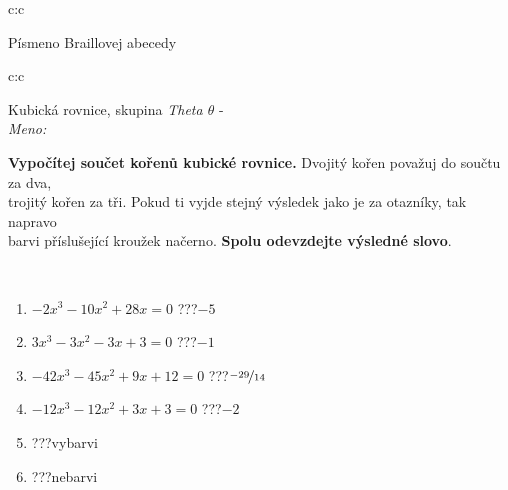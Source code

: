 \documentclass[10pt]{report}
\begin{document}
\begin{tabular}{c:c}
\begin{minipage}[c][104.5mm][t]{0.5\linewidth}
\begin{center}
\begin{minipage}{0.20\linewidth}
\begin{center}
{\small Písmeno Braillovej abecedy}
\end{center}
\end{minipage}
\end{center}
\end{minipage}
%
\end{tabular}
\newpage
\thispagestyle{empty}
\begin{tabular}{c:c}
\begin{minipage}[c][104.5mm][t]{0.5\linewidth}
\begin{center}
\vspace{7mm}
{\huge Kubická rovnice, skupina \textit{Theta $\theta$} -}\\[5mm]
\textit{Meno:}\phantom{xxxxxxxxxxxxxxxxxxxxxxxxxxxxxxxxxxxxxxxxxxxxxxxxxxxxxxxxxxxxxxxxx}\\[5mm]
\begin{minipage}{0.95\linewidth}
\textbf{Vypočítej součet kořenů kubické rovnice.} Dvojitý kořen považuj do součtu za dva,\\trojitý kořen za tři. Pokud ti vyjde stejný výsledek jako je za otazníky, tak napravo\\barvi příslušející kroužek načerno. \textbf{Spolu odevzdejte výsledné slovo}.
\end{minipage}
\\[1mm]
\begin{minipage}{0.79\linewidth}
\begin{center}
\begin{varwidth}{\linewidth}
\begin{enumerate}
\Large
\item $-2x^3-10x^2+28x=0$\quad \dotfill\; ???\;\dotfill \quad $-5$
\item $3x^3-3x^2-3x+3=0$\quad \dotfill\; ???\;\dotfill \quad $-1$
\item $-42x^3-45x^2+9x+12=0$\quad \dotfill\; ???\;\dotfill \quad $\nicefrac{-29}{14}$
\item $-12x^3-12x^2+3x+3=0$\quad \dotfill\; ???\;\dotfill \quad $-2$
\item \quad \dotfill\; ???\;\dotfill \quad vybarvi
\item \quad \dotfill\; ???\;\dotfill \quad nebarvi
\end{enumerate}
\end{varwidth}
\end{center}
\end{minipage}
\begin{minipage}{0.20\linewidth}
\begin{center}

\end{center}
\end{minipage}
\end{center}
\end{minipage}
\end{tabular}
\end{document}
